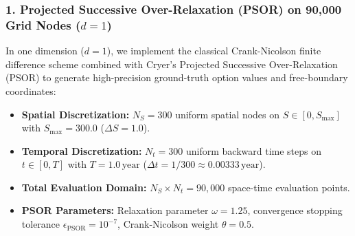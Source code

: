 \documentclass[11pt,a4paper]{article}
\begin{document}
\subsubsection{1. Projected Successive Over-Relaxation (PSOR) on 90,000 Grid Nodes \texorpdfstring{($d=1$)}{(d=1)}}
In one dimension ($d=1$), we implement the classical Crank-Nicolson finite difference scheme combined with Cryer's Projected Successive Over-Relaxation (PSOR) \cite{cryer1971solution, brennan1977valuation} to generate high-precision ground-truth option values and free-boundary coordinates:
\begin{itemize}
    \item \textbf{Spatial Discretization:} $N_S = 300$ uniform spatial nodes on $S \in [0, S_{\max}]$ with $S_{\max} = 300.0$ ($\Delta S = 1.0$).
    \item \textbf{Temporal Discretization:} $N_t = 300$ uniform backward time steps on $t \in [0, T]$ with $T = 1.0\,\text{year}$ ($\Delta t = 1/300 \approx 0.00333\,\text{year}$).
    \item \textbf{Total Evaluation Domain:} $N_S \times N_t = 90,000$ space-time evaluation points.
    \item \textbf{PSOR Parameters:} Relaxation parameter $\omega = 1.25$, convergence stopping tolerance $\epsilon_{\text{PSOR}} = 10^{-7}$, Crank-Nicolson weight $\theta = 0.5$.
\end{itemize}
\end{document}
